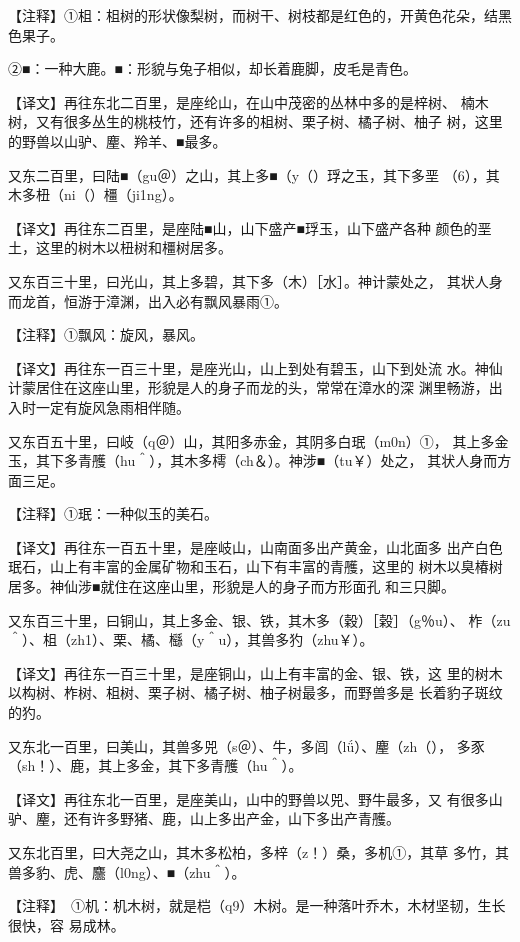 \documentclass[a4paper,12pt,UTF8,twoside]{ctexbook}
\begin{document}
【注释】①柤：柤树的形状像梨树，而树干、树枝都是红色的，开黄色花朵，结黑色果子。

②■：一种大鹿。■：形貌与兔子相似，却长着鹿脚，皮毛是青色。

【译文】再往东北二百里，是座纶山，在山中茂密的丛林中多的是梓树、 楠木树，又有很多丛生的桃枝竹，还有许多的柤树、栗子树、橘子树、柚子 树，这里的野兽以山驴、麈、羚羊、■最多。

又东二百里，曰陆■（gu＠）之山，其上多■（y（）琈之玉，其下多垩 （6），其木多杻（ni（）橿（ji1ng）。

【译文】再往东二百里，是座陆■山，山下盛产■琈玉，山下盛产各种 颜色的垩土，这里的树木以杻树和橿树居多。

又东百三十里，曰光山，其上多碧，其下多（木）［水］。神计蒙处之， 其状人身而龙首，恒游于漳渊，出入必有飘风暴雨①。

【注释】①飘风：旋风，暴风。

【译文】再往东一百三十里，是座光山，山上到处有碧玉，山下到处流 水。神仙计蒙居住在这座山里，形貌是人的身子而龙的头，常常在漳水的深 渊里畅游，出入时一定有旋风急雨相伴随。

又东百五十里，曰岐（q＠）山，其阳多赤金，其阴多白珉（m0n）①， 其上多金玉，其下多青雘（hu＾），其木多樗（ch＆）。神涉■（tu￥）处之， 其状人身而方面三足。

【注释】①珉：一种似玉的美石。

【译文】再往东一百五十里，是座岐山，山南面多出产黄金，山北面多 出产白色珉石，山上有丰富的金属矿物和玉石，山下有丰富的青雘，这里的 树木以臭椿树居多。神仙涉■就住在这座山里，形貌是人的身子而方形面孔 和三只脚。

又东百三十里，曰铜山，其上多金、银、铁，其木多（穀）［榖］（g％u）、 柞（zu＾）、柤（zh1）、栗、橘、櫾（y＾u），其兽多犳（zhu￥）。

【译文】再往东一百三十里，是座铜山，山上有丰富的金、银、铁，这 里的树木以构树、柞树、柤树、栗子树、橘子树、柚子树最多，而野兽多是 长着豹子斑纹的犳。

又东北一百里，曰美山，其兽多兕（s＠）、牛，多闾（lǘ）、麈（zh（）， 多豕（sh！）、鹿，其上多金，其下多青雘（hu＾）。

【译文】再往东北一百里，是座美山，山中的野兽以兕、野牛最多，又 有很多山驴、麈，还有许多野猪、鹿，山上多出产金，山下多出产青雘。

又东北百里，曰大尧之山，其木多松柏，多梓（z！）桑，多机①，其草 多竹，其兽多豹、虎、麢（l0ng）、■（zhu＾）。

【注释】　①机：机木树，就是桤（q9）木树。是一种落叶乔木，木材坚韧，生长很快，容 易成林。
\end{document}
